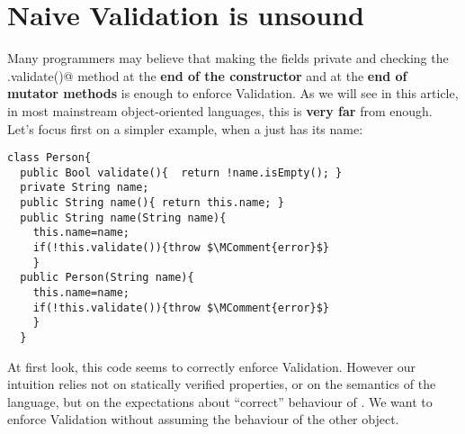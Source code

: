 \section{Naive Validation is unsound}
\saveSpace\saveSpace
Many programmers may believe that making the fields private and checking the \Q@.validate()@ method
at the \textbf{end of the constructor} and at the \textbf{end of mutator methods} is enough to enforce
Validation.
As we will see in this article, in most mainstream object-oriented languages, this is \textbf{very far} from enough.
Let's focus first on a simpler example, when a \Q@Person@ just has its name:
\begin{lstlisting}
class Person{
  public Bool validate(){  return !name.isEmpty(); }
  private String name;
  public String name(){ return this.name; }
  public String name(String name){
    this.name=name;
    if(!this.validate()){throw $\MComment{error}$}
    }
  public Person(String name){
    this.name=name;
    if(!this.validate()){throw $\MComment{error}$}
    }
  }
\end{lstlisting}
\noindent At first look, this code seems to correctly enforce Validation.
However our intuition relies not on statically verified properties, or on the semantics of the language,
but on the expectations about ``correct'' behaviour of \Q@String@.
We want to enforce Validation without assuming the behaviour of the other object.
